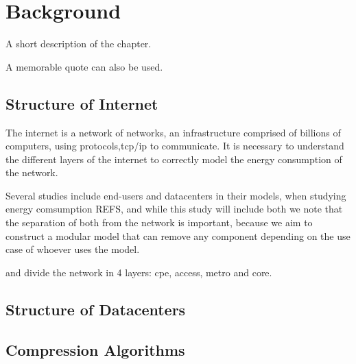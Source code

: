 

\chapter{Background}
\label{chapter:background}

\begin{introduction}
A short description of the chapter.

A memorable quote can also be used.
\end{introduction}

\section{Structure of Internet}

The internet is a network of networks, an infrastructure comprised of billions of computers, 
using protocols,\ac{tcp}/\ac{ip} to communicate. 
It is necessary to understand the different layers of the internet to correctly model the 
energy consumption of the network.

Several studies include end-users and datacenters in their models, when studying 
energy comsumption REFS, and while this study will include both we note that the 
separation of both from the network is important, because we aim to
construct a modular model that can remove any component depending on
the use case of whoever uses the model.

\citet{Coroama2015} and \citet{Schien2015} divide the network in 4 layers: \ac{cpe}, access, metro and core.



\section{Structure of Datacenters}

\section{Compression Algorithms}